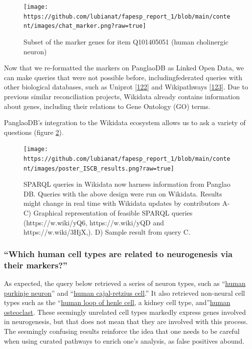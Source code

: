 \begin{figure}
\hypertarget{fig:chat_marker}{%
\centering
\texttt{[image: https://github.com/lubianat/fapesp\_report\_1/blob/main/content/images/chat\_marker.png?raw=true]}
\caption{Subset of the marker genes for item Q101405051 (human cholinergic neuron)}\label{fig:chat_marker}
}
\end{figure}

Now that we re-formatted the markers on PanglaoDB as Linked Open Data, we can make queries that were not possible before, includingfederated queries with other biological databases, such as Uniprot {[}\protect\hyperlink{ref-HUJ9NzAb}{122}{]}
and Wikipathways {[}\protect\hyperlink{ref-AgOOCR24}{123}{]}.
Due to previous similar reconciliation projects, Wikidata already contains information about genes, including their relations to Gene Ontology (GO) terms.

PanglaoDB's integration to the Wikidata ecosystem allows us to ask a variety of questions (figure \ref{fig:iscb_results}).

\begin{figure}
\hypertarget{fig:iscb_results}{%
\centering
\texttt{[image: https://github.com/lubianat/fapesp\_report\_1/blob/main/content/images/poster\_ISCB\_results.png?raw=true]}
\caption{SPARQL queries in Wikidata now harness information from Panglao DB. Queries with the above design were run on Wikidata. Results might change in real time with Wikidata updates by contributors A-C) Graphical representation of feasible SPARQL queries (https://w.wiki/yQ6, https://w.wiki/yQD and https://w.wiki/3HjX,). D) Sample result from query C.}\label{fig:iscb_results}
}
\end{figure}

\hypertarget{which-human-cell-types-are-related-to-neurogenesis-via-their-markers}{%
\subsubsection{``Which human cell types are related to neurogenesis via their markers?''}\label{which-human-cell-types-are-related-to-neurogenesis-via-their-markers}}

As expected, the query below retrieved a series of neuron types, such as ``\href{https://www.wikidata.org/wiki/Q101404913}{human purkinje neuron}'' and ``\href{https://www.wikidata.org/wiki/Q101405091}{human cajal-retzius cell}.'' It also retrieved non-neural cell types such as the ``\href{https://www.wikidata.org/wiki/Q101405109}{human loop of henle cell}, a kidney cell type, and''\href{https://www.wikidata.org/wiki/Q101404928}{human osteoclast}. These seemingly unrelated cell types markedly express genes involved in neurogenesis, but that does not mean that they are involved with this process. The seemingly confusing results reinforce the idea that one needs to be careful when using curated pathways to enrich one's analysis, as false positives abound.

